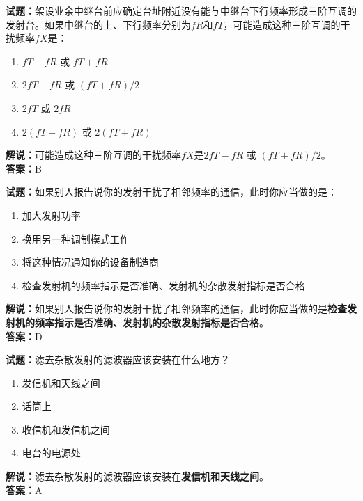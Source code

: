 \documentclass{ctexbook}
\begin{document}
\vspace{1em}

\textbf{试题：}架设业余中继台前应确定台址附近没有能与中继台下行频率形成三阶互调的发射台。如果中继台的上、下行频率分别为\(fR\)和\(fT\)，可能造成这种三阶互调的干扰频率\(fX\)是：
\begin{enumerate}[leftmargin=3em]
  \item \(fT - fR\) 或 \(fT + fR\)
  \item \(2fT - fR\) 或 \((fT + fR ) / 2\)
  \item \(2fT\) 或 \(2fR\)
  \item \(2(fT - fR)\) 或 \(2(fT + fR )\) %
\end{enumerate}
\noindent\textbf{解说：}可能造成这种三阶互调的干扰频率\(fX\)是\(2fT - fR\) 或 \((fT + fR ) / 2\)。\\
\noindent\textbf{答案：}B

\vspace{1em}

\textbf{试题：}如果别人报告说你的发射干扰了相邻频率的通信，此时你应当做的是：
\begin{enumerate}[leftmargin=3em]
  \item 加大发射功率
  \item 换用另一种调制模式工作
  \item 将这种情况通知你的设备制造商
  \item 检查发射机的频率指示是否准确、发射机的杂散发射指标是否合格
\end{enumerate}
\noindent\textbf{解说：}如果别人报告说你的发射干扰了相邻频率的通信，此时你应当做的是\textbf{检查发射机的频率指示是否准确、发射机的杂散发射指标是否合格}。\\\noindent\textbf{答案：}D

\vspace{1em}

\textbf{试题：}滤去杂散发射的滤波器应该安装在什么地方？
\begin{enumerate}[leftmargin=3em]
  \item 发信机和天线之间
  \item 话筒上
  \item 收信机和发信机之间
  \item 电台的电源处
\end{enumerate}
\noindent\textbf{解说：}滤去杂散发射的滤波器应该安装在\textbf{发信机和天线之间}。\\\noindent\textbf{答案：}A

\vspace{1em}
\end{document}
